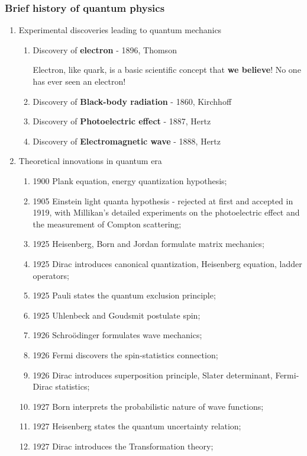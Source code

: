 \documentclass[12pt]{article}
\numberwithin{equation}{section}
\begin{document}
\subsubsection{Brief history of quantum physics}
\begin{enumerate}
\item Experimental discoveries leading to quantum mechanics \par
	\begin{enumerate}
	\item Discovery of \textbf{electron} - 1896, Thomson \par
		Electron, like quark, is a basic scientific concept that \textbf{we believe}! No one has ever seen an electron!
	\item Discovery of \textbf{Black-body radiation} - 1860, Kirchhoff
	\item Discovery of \textbf{Photoelectric effect} - 1887, Hertz
	\item Discovery of \textbf{Electromagnetic wave} - 1888, Hertz
	\end{enumerate}	
\item Theoretical innovations in quantum era
	\begin{enumerate}
	\item 1900 Plank equation, energy quantization hypothesis;
	\item 1905 Einstein light quanta hypothesis - rejected at first and accepted in 1919, with Millikan's detailed experiments on the photoelectric effect and the measurement of Compton scattering;
	\item 1925 Heisenberg, Born and Jordan formulate matrix mechanics;
	\item 1925 Dirac introduces canonical quantization, Heisenberg equation, ladder operators;
	\item 1925 Pauli states the quantum exclusion principle;
	\item 1925 Uhlenbeck and Goudsmit postulate spin;
	\item 1926 Schro\"{o}dinger formulates wave mechanics;
	\item 1926 Fermi discovers the spin-statistics connection;
	\item 1926 Dirac introduces superposition principle, Slater determinant, Fermi-Dirac statistics;
	\item 1927 Born interprets the probabilistic nature of wave functions;
	\item 1927 Heisenberg states the quantum uncertainty relation;
	\item 1927 Dirac introduces the Transformation theory;

\end{enumerate}
\end{enumerate}
\end{document}
